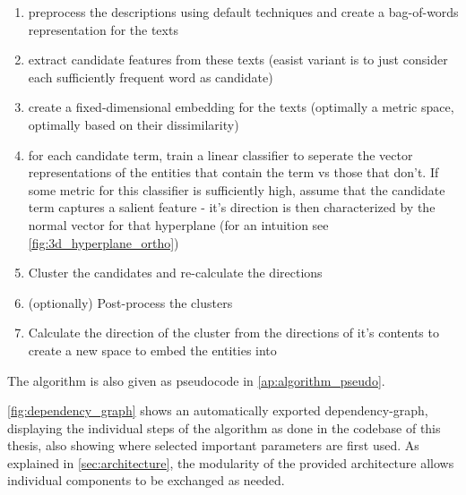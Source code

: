 
\label{sec:algorithmsteps}
\begin{enumerate}
	\item[\saveref{sec:algo_preproc}{1.}] preprocess the descriptions using default techniques and create a bag-of-words representation for the texts
	\item[\saveref{sec:extract_cands}{2.}] extract candidate features from these texts (easist variant is to just consider each sufficiently frequent word as candidate)
	\item[\saveref{sec:generate_vectorspaces}{3.}] create a fixed-dimensional embedding for the texts (optimally a metric space, optimally based on their dissimilarity)
	\item[\saveref{sec:svm_filter_cands}{4.}] for each candidate term, train a linear classifier to seperate the vector representations of the entities that contain the term vs those that don't. If some metric for this classifier is sufficiently high, assume that the candidate term captures a salient feature - it's direction is then characterized by the normal vector for that hyperplane (for an intuition see \ref{fig:3d_hyperplane_ortho})
	\item[\saveref{sec:generate_vectorspaces}{5.}] Cluster the candidates and re-calculate the directions
	\item[\saveref{sec:generate_vectorspaces}{6.}] (optionally) Post-process the clusters 
	\item[\saveref{sec:generate_vectorspaces}{7.}] Calculate the direction of the cluster from the directions of it's contents to create a new space to embed the entities into
\end{enumerate}

The algorithm is also given as pseudocode in \autoref{ap:algorithm_pseudo}.


\autoref{fig:dependency_graph} shows an automatically exported dependency-graph, displaying the individual steps of the algorithm as done in the codebase of this thesis, also showing where selected important parameters are first used. As explained in \autoref{sec:architecture}, the modularity of the provided architecture allows individual components to be exchanged as needed.



